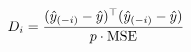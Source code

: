 \documentclass[preview]{standalone}
\begin{document}
\begin{align*}
\special{dvisvgm:raw <g id='unique000'>}D_i = \frac{(\hat{y}_{(-i)} - \hat{y})^\top(\hat{y}_{(-i)} - \hat{y})}{p \cdot \text{MSE}}\special{dvisvgm:raw </g>}
\end{align*}
\end{document}
